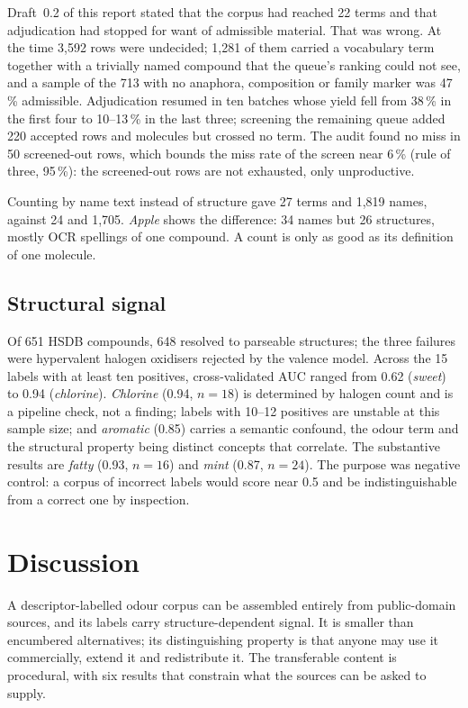\documentclass[
  computerscience
]{genesisl1-paper}
\begin{document}
Draft~0.2 of this report stated that the corpus had reached 22 terms and that
adjudication had stopped for want of admissible material. That was wrong. At the time
3{,}592 rows were undecided; 1{,}281 of them carried a vocabulary term together with a
trivially named compound that the queue's ranking could not see, and a sample of the 713
with no anaphora, composition or family marker was 47\,\% admissible. Adjudication
resumed in ten batches whose yield fell from 38\,\% in the first four to 10--13\,\% in
the last three; screening the remaining queue added 220 accepted rows and molecules but
crossed no term. The audit found no miss in 50 screened-out rows, which bounds the miss
rate of the screen near 6\,\% (rule of three, 95\,\%): the screened-out rows are not
exhausted, only unproductive.

Counting by name text instead of structure gave 27 terms and 1{,}819 names, against 24
and 1{,}705. \emph{Apple} shows the difference: 34 names but 26 structures, mostly OCR
spellings of one compound. A count is only as good as its definition of one molecule.

\subsection{Structural signal}

Of 651 HSDB compounds, 648 resolved to parseable structures; the three failures were
hypervalent halogen oxidisers rejected by the valence model. Across the 15 labels with at
least ten positives, cross-validated AUC ranged from 0.62 (\emph{sweet}) to 0.94
(\emph{chlorine}). \emph{Chlorine} (0.94, $n=18$) is determined by halogen count and is a
pipeline check, not a finding; labels with 10--12 positives are unstable at this sample
size; and \emph{aromatic} (0.85) carries a semantic confound, the odour term and the
structural property being distinct concepts that correlate. The substantive results are
\emph{fatty} (0.93, $n=16$) and \emph{mint} (0.87, $n=24$). The purpose was negative
control: a corpus of incorrect labels would score near 0.5 and be indistinguishable from a
correct one by inspection.

\section{Discussion}

A descriptor-labelled odour corpus can be assembled entirely from public-domain sources,
and its labels carry structure-dependent signal. It is smaller than encumbered
alternatives; its distinguishing property is that anyone may use it commercially, extend
it and redistribute it. The transferable content is procedural, with six results that
constrain what the sources can be asked to supply.
\end{document}
